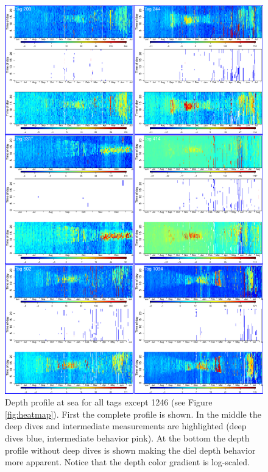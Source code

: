 \begin{figure}[ht]
  \centering
  \includegraphics[width=.85\linewidth]{figS1}    
  \caption{Depth profile at sea for all tags except 1246 (see Figure \ref{fig:heatmap}). First the complete profile is shown. In the middle the deep dives and intermediate measurements are highlighted (deep dives blue, intermediate behavior pink). At the bottom the depth profile without deep dives is shown making the diel depth behavior more apparent. Notice that the depth color gradient is log-scaled.}
  \label{fig:alldep}
\end{figure}




